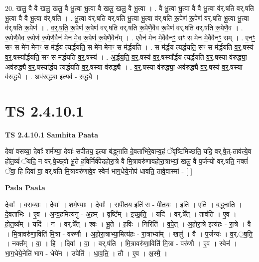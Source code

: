 \documentclass[17pt]{extarticle}
\begin{document}
20. खलु॒ वै वै खलु॒ खलु॒ वै भू॒त्वा भू॒त्वा वै खलु॒ खलु॒ वै भू॒त्वा । . वै भू॒त्वा भू॒त्वा वै वै भू॒त्वा व॑र्.षति वर्.षति भू॒त्वा वै वै भू॒त्वा व॑र्.षति । . भू॒त्वा व॑र्.षति वर्.षति भू॒त्वा भू॒त्वा व॑र्.षति रू॒पेण॑ रू॒पेण॑ वर्.षति भू॒त्वा भू॒त्वा व॑र्.षति रू॒पेण॑ । . व॒र्॒.ष॒ति॒ रू॒पेण॑ रू॒पेण॑ वर्.षति वर्.षति रू॒पेणै॒वैव रू॒पेण॑ वर्.षति वर्.षति रू॒पेणै॒व । . रू॒पेणै॒वैव रू॒पेण॑ रू॒पेणै॒वैन॑ मेन मे॒व रू॒पेण॑ रू॒पेणै॒वैन᳚म् । . ए॒वैन॑ मेन मे॒वैवैनꣳ॒॒ सꣳ स मे॑न मे॒वैवैनꣳ॒॒ सम् । . ए॒नꣳ॒॒ सꣳ स मे॑न मेनꣳ॒॒ स म॑र्द्धय त्यर्द्धयति॒ स मे॑न मेनꣳ॒॒ स म॑र्द्धयति । . स म॑र्द्धय त्यर्द्धयति॒ सꣳ स म॑र्द्धयति व॒र्॒.षस्य॑ व॒र्॒.षस्या᳚र्द्धयति॒ सꣳ स म॑र्द्धयति व॒र्॒.षस्य॑ । . अ॒र्द्ध॒य॒ति॒ व॒र्॒.षस्य॑ व॒र्॒.षस्या᳚र्द्धय त्यर्द्धयति व॒र्॒.षस्या व॑रुद्ध्या॒ अव॑रुद्ध्यै व॒र्॒.षस्या᳚र्द्धय त्यर्द्धयति व॒र्॒.षस्या व॑रुद्ध्यै । . व॒र्॒.षस्या व॑रुद्ध्या॒ अव॑रुद्ध्यै व॒र्॒.षस्य॑ व॒र्॒.षस्या व॑रुद्ध्यै । . अव॑रुद्ध्या॒ इत्यव॑ - रु॒द्ध्यै॒ । \newline
\pagebreak
{}
\section*{ TS 2.4.10.1 }

\textbf{TS 2.4.10.1 } \newline
\textbf{Samhita Paata} \newline

देवा॑ वसव्या॒ देवाः᳚ शर्मण्या॒ देवाः᳚ सपीतय॒ इत्या ब॑द्ध्नाति दे॒वता॑भिरे॒वान्व॒हं ॅवृष्टि॑मिच्छति॒ यदि॒ वर्.षे॒त्-ताव॑त्ये॒व हो॑त॒व्यं॑ ॅयदि॒ न वर्.षे॒च्छ्वो भू॒ते ह॒विर्निर्व॑पेदहोरा॒त्रे वै मि॒त्रावरु॑णावहोरा॒त्राभ्यां॒ खलु॒ वै प॒र्जन्यो॑ वर्.षति॒ नक्तं॑ ॅवा॒ हि दिवा॑ वा॒ वर्.ष॑ति मि॒त्रावरु॑णावे॒व स्वेन॑ भाग॒धेये॒नोप॑ धावति॒ तावे॒वास्मा॑ - [  ] \newline

\textbf{Pada Paata} \newline

देवाः᳚ । व॒स॒व्याः॒ । देवाः᳚ । श॒र्म॒ण्याः॒ । देवाः᳚ । स॒पी॒त॒य॒ इति॑ स - पी॒त॒यः॒ । इति॑ । एति॑ । ब॒द्ध्ना॒ति॒ । दे॒वता॑भिः । ए॒व । अ॒न्व॒हमित्य॑नु - अ॒हम् । वृष्टि᳚म् । इ॒च्छ॒ति॒ । यदि॑ । वर्.षे᳚त् । ताव॑ति । ए॒व । हो॒त॒व्य᳚म् । यदि॑ । न । वर्.षे᳚त् । श्वः । भू॒ते । ह॒विः । निरिति॑ । व॒पे॒त् । अ॒हो॒रा॒त्रे इत्य॑हः - रा॒त्रे । वै । मि॒त्रावरु॑णा॒विति॑ मि॒त्रा - वरु॑णौ । अ॒हो॒रा॒त्राभ्या॒मित्य॑हः - रा॒त्राभ्या᳚म् । खलु॑ । वै । प॒र्जन्यः॑ । व॒र्.॒ष॒ति॒ । नक्त᳚म् । वा॒ । हि । दिवा᳚ । वा॒ । वर्.ष॑ति । मि॒त्रावरु॑णा॒विति॑ मि॒त्रा - वरु॑णौ । ए॒व । स्वेन॑ । भा॒ग॒धेये॒नेति॑ भाग - धेये॑न । उपेति॑ । धा॒व॒ति॒ । तौ । ए॒व । अ॒स्मै॒ ।  \newline
\end{document}
